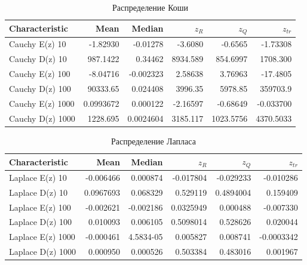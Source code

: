 \begin{table}[ht]
	\centering
	\begin{tabular}[t]{lrrrrr}
		\hline
		Characteristic   &        Mean &    Median &            $z_R$ &       $z_Q$ &      $z_{tr}$ \\
		\hline
		Cauchy E(z) 10   &   -1.82930 &  -0.01278 &   -3.6080     &  -0.6565 &  -1.73308 \\
		Cauchy D(z) 10   &  987.1422    &  0.34462 & 8934.589       &  854.6997 &  1708.300 \\
		Cauchy E(z) 100  &   -8.04716  & -0.002323 & 2.58638      & 3.76963 & -17.4805 \\
		Cauchy D(z) 100  & 90333.65   &  0.024408 &    3996.35 &  5978.85 &  359703.9  \\
		Cauchy E(z) 1000 &   0.0993672  & 0.000122 &  -2.16597     &  -0.68649  & -0.033700 \\
		Cauchy D(z) 1000 & 1228.695   &  0.0024604 &    3185.117 &  1023.5756 &  4370.5033 \\
		\hline
	\end{tabular}
	\caption{Распределение Коши}
	\label{tab:cauchy}
\end{table}

\begin{table}[ht]
	\centering
	\begin{tabular}[t]{lrrrrr}
		\hline
		Characteristic    &      Mean &    Median &       $z_R$ &       $z_Q$ &      $z_{tr}$ \\
		\hline
		Laplace E(z) 10   &  -0.006466 &  0.000874 & -0.017804 &  -0.029233 &  -0.010286 \\
		Laplace D(z) 10   &  0.0967693 &  0.068329 &  0.529119 &  0.4894004 &  0.159409 \\
		Laplace E(z) 100  & -0.002621 & -0.002186 & 0.0325949 & 0.000488 & -0.007330 \\
		Laplace D(z) 100  &  0.010093 &  0.006105 &  0.5098014 &  0.528626 &  0.020044 \\
		Laplace E(z) 1000 &  -0.000461 &  4.5834-05 &  0.005827 &  0.008741 &  -0.0003342 \\
		Laplace D(z) 1000 &  0.000950 &  0.000526 &  0.503384 &  0.483016 &  0.001967 \\
		\hline
	\end{tabular}
	\caption{Распределение Лапласа}
	\label{tab:laplace}
\end{table}

